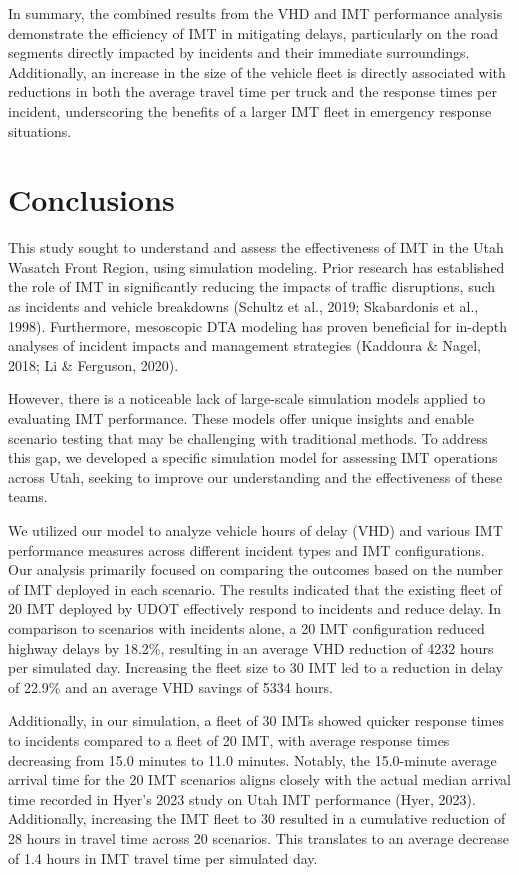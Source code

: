 \documentclass[fancy, oneside, mastersfancy, ms]{byuthesis}
\begin{document}
In summary, the combined results from the VHD and IMT performance
analysis demonstrate the efficiency of IMT in mitigating delays,
particularly on the road segments directly impacted by incidents and
their immediate surroundings. Additionally, an increase in the size of
the vehicle fleet is directly associated with reductions in both the
average travel time per truck and the response times per incident,
underscoring the benefits of a larger IMT fleet in emergency response
situations.


\hypertarget{sec-conclusions}{%
\chapter{Conclusions}\label{sec-conclusions}}

This study sought to understand and assess the effectiveness of IMT in
the Utah Wasatch Front Region, using simulation modeling. Prior research
has established the role of IMT in significantly reducing the impacts of
traffic disruptions, such as incidents and vehicle breakdowns (Schultz
et al., 2019; Skabardonis et al., 1998). Furthermore, mesoscopic DTA
modeling has proven beneficial for in-depth analyses of incident impacts
and management strategies (Kaddoura \& Nagel, 2018; Li \& Ferguson,
2020).

However, there is a noticeable lack of large-scale simulation models
applied to evaluating IMT performance. These models offer unique
insights and enable scenario testing that may be challenging with
traditional methods. To address this gap, we developed a specific
simulation model for assessing IMT operations across Utah, seeking to
improve our understanding and the effectiveness of these teams.

We utilized our model to analyze vehicle hours of delay (VHD) and
various IMT performance measures across different incident types and IMT
configurations. Our analysis primarily focused on comparing the outcomes
based on the number of IMT deployed in each scenario. The results
indicated that the existing fleet of 20 IMT deployed by UDOT effectively
respond to incidents and reduce delay. In comparison to scenarios with
incidents alone, a 20 IMT configuration reduced highway delays by
18.2\%, resulting in an average VHD reduction of 4232 hours per
simulated day. Increasing the fleet size to 30 IMT led to a reduction in
delay of 22.9\% and an average VHD savings of 5334 hours.

Additionally, in our simulation, a fleet of 30 IMTs showed quicker
response times to incidents compared to a fleet of 20 IMT, with average
response times decreasing from 15.0 minutes to 11.0 minutes. Notably,
the 15.0-minute average arrival time for the 20 IMT scenarios aligns
closely with the actual median arrival time recorded in Hyer's 2023
study on Utah IMT performance (Hyer, 2023). Additionally, increasing the
IMT fleet to 30 resulted in a cumulative reduction of 28 hours in travel
time across 20 scenarios. This translates to an average decrease of 1.4
hours in IMT travel time per simulated day.
\end{document}
